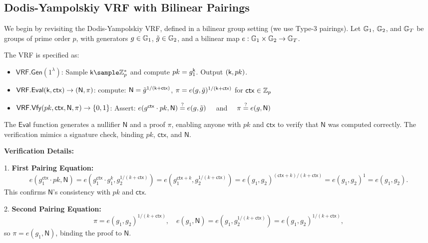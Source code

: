 \begin{enumerate}
\end{enumerate}




\subsection{Dodis-Yampolskiy VRF with Bilinear Pairings}
We begin by revisiting the Dodis-Yampolskiy VRF, defined in a bilinear group setting (we use Type-3 pairings). Let $\mathbb{G}_1$, $\mathbb{G}_2$, and $\mathbb{G}_T$ be groups of prime order $p$, with generators $g \in \mathbb{G}_1$, $\tilde{g} \in \mathbb{G}_2$, and a bilinear map $e: \mathbb{G}_1 \times \mathbb{G}_2 \to \mathbb{G}_T$.

The VRF is specified as:
\begin{itemize}
    \item $\mathsf{VRF.Gen}(1^\lambda)$: Sample $\k \sample \mathbb{Z}_p^*$ and compute $pk = g_1^{\mathsf{k}}$. Output $(\mathsf{k}, pk)$.
    \item $\mathsf{VRF.Eval}(\mathsf{k}, \mathsf{ctx}) \to (\mathsf{N}, \pi)$: compute: $\mathsf{N} = \tilde{g}^{1/(\mathsf{k} + \mathsf{ctx})}$, $\pi = e(g, \tilde{g})^{1/(\mathsf{k} + \mathsf{ctx})}$ for $\mathsf{ctx} \in \mathbb{Z}_p$
    \item $\mathsf{VRF.Vfy}(pk, \mathsf{ctx}, \mathsf{N}, \pi) \to \{0, 1\}$: Assert: $e(g^{\mathsf{ctx}} \cdot pk, \mathsf{N}) \stackrel{?}{=} e(g, \tilde{g}) \quad $ and $\quad \pi \stackrel{?}{=} e(g, \mathsf{N})$
\end{itemize}

The $\mathsf{Eval}$ function generates a nullifier $\mathsf{N}$ and a proof $\pi$, enabling anyone with $pk$ and $\textsf{ctx}$ to verify that $\mathsf{N}$ was computed correctly. The verification mimics a signature check, binding $pk$, $\textsf{ctx}$, and $\mathsf{N}$.

\textbf{Verification Details:}

1. \textbf{First Pairing Equation:}
   \[
   e(g_1^{\textsf{ctx}} \cdot pk, \mathsf{N}) = e(g_1^{\textsf{ctx}} \cdot g_1^k, g_2^{1/(k + \textsf{ctx})}) = e(g_1^{\textsf{ctx} + k}, g_2^{1/(k + \textsf{ctx})}) = e(g_1, g_2)^{(\textsf{ctx} + k)/(k + \textsf{ctx})} = e(g_1, g_2)^1 = e(g_1, g_2).
   \]
   This confirms $\mathsf{N}$'s consistency with $pk$ and $\textsf{ctx}$.

2. \textbf{Second Pairing Equation:}
   \[
   \pi = e(g_1, g_2)^{1/(k + \textsf{ctx})}, \quad e(g_1, \mathsf{N}) = e(g_1, g_2^{1/(k + \textsf{ctx})}) = e(g_1, g_2)^{1/(k + \textsf{ctx})},
   \]
   so $\pi = e(g_1, \mathsf{N})$, binding the proof to $\mathsf{N}$.

